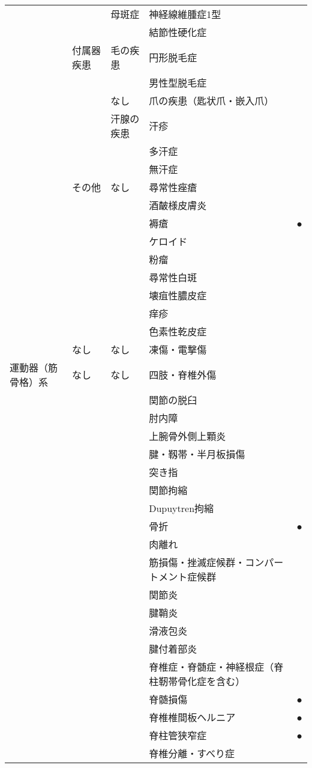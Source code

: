 \begin{xltabular}{\linewidth}{XXXXX}
 &  & 母斑症 & 神経線維腫症1型 &  \\
 &  &  & 結節性硬化症 &  \\
 & 付属器疾患 & 毛の疾患 & 円形脱毛症 &  \\
 &  &  & 男性型脱毛症 &  \\
 &  & なし & 爪の疾患（匙状爪・嵌入爪） &  \\
 &  & 汗腺の疾患 & 汗疹 &  \\
 &  &  & 多汗症 &  \\
 &  &  & 無汗症 &  \\
 & その他 & なし & 尋常性痤瘡 &  \\
 &  &  & 酒皶様皮膚炎 &  \\
 &  &  & 褥瘡 & ● \\
 &  &  & ケロイド &  \\
 &  &  & 粉瘤 &  \\
 &  &  & 尋常性白斑 &  \\
 &  &  & 壊疽性膿皮症 &  \\
 &  &  & 痒疹 &  \\
 &  &  & 色素性乾皮症 &  \\
 & なし & なし & 凍傷・電撃傷 &  \\
運動器（筋骨格）系 & なし & なし & 四肢・脊椎外傷 &  \\
 &  &  & 関節の脱臼 &  \\
 &  &  & 肘内障 &  \\
 &  &  & 上腕骨外側上顆炎 &  \\
 &  &  & 腱・靱帯・半月板損傷 &  \\
 &  &  & 突き指 &  \\
 &  &  & 関節拘縮 &  \\
 &  &  & Dupuytren拘縮 &  \\
 &  &  & 骨折 & ● \\
 &  &  & 肉離れ &  \\
 &  &  & 筋損傷・挫滅症候群・コンパートメント症候群 &  \\
 &  &  & 関節炎 &  \\
 &  &  & 腱鞘炎 &  \\
 &  &  & 滑液包炎 &  \\
 &  &  & 腱付着部炎 &  \\
 &  &  & 脊椎症・脊髄症・神経根症（脊柱靭帯骨化症を含む） &  \\
 &  &  & 脊髄損傷 & ● \\
 &  &  & 脊椎椎間板ヘルニア & ● \\
 &  &  & 脊柱管狭窄症 & ● \\
 &  &  & 脊椎分離・すべり症 &  \\

\end{xltabular}
